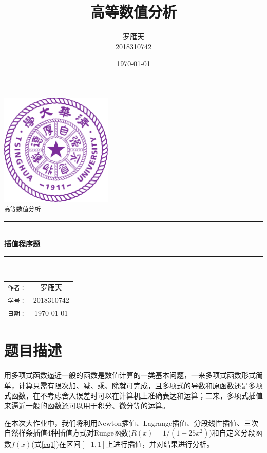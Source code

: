 \documentclass[a4paper]{article}
\title{高等数值分析}
\author{罗雁天 \\
2018310742}
\date{\today}
\begin{document}
\newcommand{\HRule}{\rule{\linewidth}{0.5mm}}
\begin{titlepage}
	\begin{center}
		\includegraphics[width=0.4\textwidth]{Tsinghua2.png}\\[1cm]
		\textsc{\Large \texttt{高等数值分析}}\\[1cm]
		\HRule \\[1cm]
		{\Huge \bfseries 插值程序题}\\[0.4cm]
		\HRule \\[3.5cm]
		\begin{minipage}{0.4\textwidth}
			\begin{center}
				\Large
				\begin{tabular}{cc}
					\texttt{作者：} & 罗雁天 \\[0.5cm]
					\texttt{学号：} & 2018310742 \\[0.5cm]
					\texttt{日期：} & \today
				\end{tabular}
			\end{center}
		\end{minipage}
		\vfill
	\end{center}
\end{titlepage}

\tableofcontents
\newpage

\section{题目描述}
用多项式函数逼近一般的函数是数值计算的一类基本问题，一来多项式函数形式简单，计算只需有限次加、减、乘、除就可完成，且多项式的导数和原函数还是多项式函数，在不考虑舍入误差时可以在计算机上准确表达和运算；二来，多项式插值来逼近一般的函数还可以用于积分、微分等的运算。

在本次大作业中，我们将利用Newton插值、Lagrange插值、分段线性插值、三次自然样条插值4种插值方式对Runge函数($R(x)=1/(1+25x^2)$)和自定义分段函数$f(x)$(式\ref{eq1})在区间$[-1,1]$上进行插值，并对结果进行分析。
\end{document}
